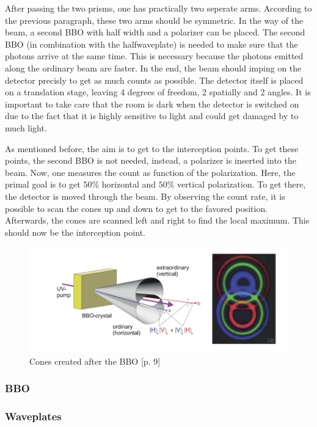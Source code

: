 \documentclass[12pt,a4paper]{article}
\begin{document}
\begin{multicols}{2}
 After passing the two prisms, one has practically two seperate arms. According to the previous paragraph, these two arms should be symmetric. In the way of the beam, a second BBO with half width and a polarizer can be placed. The second BBO (in combination with the halfwaveplate) is needed to make sure that the photons arrive at the same time. This is necessary because the photons emitted along the ordinary beam are faster. In the end, the beam should imping on the detector precisly to get as much counts as possible. The detector itself is placed on a translation stage, leaving 4 degrees of freedom, 2 spatially and 2 angles. It is important to take care that the room is dark when the detector is switched on due to the fact that it is highly sensitive to light and could get damaged by to much light.
 
 As mentioned before, the aim is to get to the interception points. To get these points, the second BBO is not needed, instead, a polarizer is inserted into the beam. Now, one measures the count as function of the polarization. Here, the primal goal is to get $50\%$ horizontal and $50\%$ vertical polarization. To get there, the detector is moved through the beam. By observing the count rate, it is possible to scan the cones up and down to get to the favored position. Afterwards, the cones are scanned left and right to find the local maximum. This should now be the interception point.
 
 




\begin{figure}[H]
 \centering
 \includegraphics[scale=0.7]{./figures/cones.png}
 \caption{Cones created after the BBO \cite{physikwiki}[p. 9]}
 \label{fig:cones}
\end{figure}

\subsubsection{BBO}
\subsubsection{Waveplates}

\end{multicols}
\end{document}
